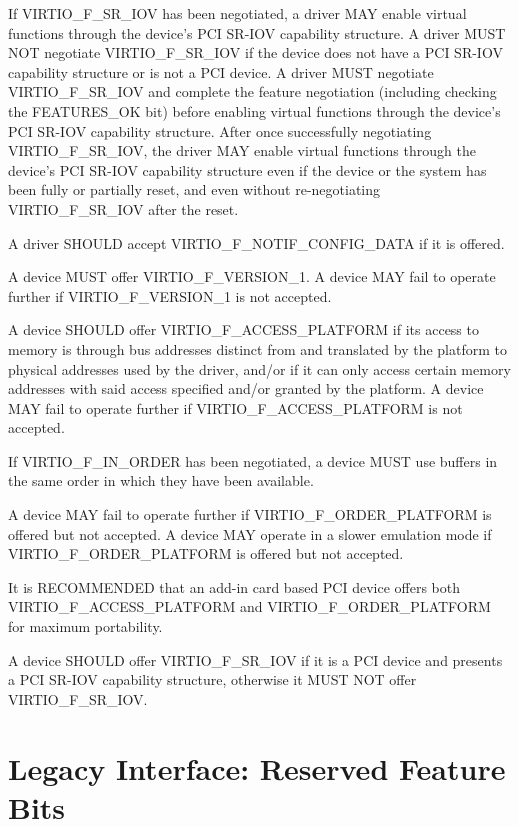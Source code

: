 If VIRTIO_F_SR_IOV has been negotiated, a driver MAY enable
virtual functions through the device's PCI SR-IOV capability
structure.  A driver MUST NOT negotiate VIRTIO_F_SR_IOV if
the device does not have a PCI SR-IOV capability structure
or is not a PCI device.  A driver MUST negotiate
VIRTIO_F_SR_IOV and complete the feature negotiation
(including checking the FEATURES_OK 
bit) before enabling virtual functions through the device's
PCI SR-IOV capability structure.  After once successfully
negotiating VIRTIO_F_SR_IOV, the driver MAY enable virtual
functions through the device's PCI SR-IOV capability
structure even if the device or the system has been fully
or partially reset, and even without re-negotiating
VIRTIO_F_SR_IOV after the reset.

A driver SHOULD accept VIRTIO_F_NOTIF_CONFIG_DATA if it is offered.


A device MUST offer VIRTIO_F_VERSION_1.  A device MAY fail to operate further
if VIRTIO_F_VERSION_1 is not accepted.

A device SHOULD offer VIRTIO_F_ACCESS_PLATFORM if its access to
memory is through bus addresses distinct from and translated
by the platform to physical addresses used by the driver, and/or
if it can only access certain memory addresses with said access
specified and/or granted by the platform.
A device MAY fail to operate further if VIRTIO_F_ACCESS_PLATFORM is not
accepted.

If VIRTIO_F_IN_ORDER has been negotiated, a device MUST use
buffers in the same order in which they have been available.

A device MAY fail to operate further if
VIRTIO_F_ORDER_PLATFORM is offered but not accepted.
A device MAY operate in a slower emulation mode if
VIRTIO_F_ORDER_PLATFORM is offered but not accepted.

It is RECOMMENDED that an add-in card based PCI device
offers both VIRTIO_F_ACCESS_PLATFORM and
VIRTIO_F_ORDER_PLATFORM for maximum portability.

A device SHOULD offer VIRTIO_F_SR_IOV if it is a PCI device
and presents a PCI SR-IOV capability structure, otherwise
it MUST NOT offer VIRTIO_F_SR_IOV.

\section{Legacy Interface: Reserved Feature Bits}\label{sec:Reserved Feature Bits / Legacy Interface: Reserved Feature Bits}

